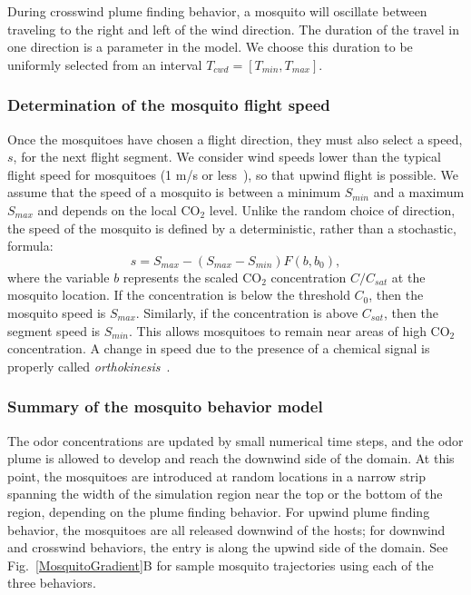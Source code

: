 \documentclass[10pt]{article}
\begin{document}
During crosswind plume finding behavior, a mosquito will oscillate
between traveling to the right and left of the wind direction.
The duration of the travel in one direction is a parameter in
the model. We choose this duration to be uniformly selected
from an interval $T_{cwd} = [T_{min},T_{max}]$.

\subsubsection*{Determination of the mosquito flight speed}
Once the mosquitoes have chosen a flight direction, they must also select a speed, $s$, for the next flight segment. 
We consider wind speeds lower than the typical flight speed for mosquitoes (1 m/s or less~\cite{Clements1999,Gibson1999}), so that upwind flight is possible. We assume that the speed of a mosquito is between a minimum $S_{min}$ and a maximum $S_{max}$ and depends on the local CO$_2$ level. Unlike the random choice of direction, the speed of the mosquito is defined by a deterministic, rather than a stochastic, formula:
\begin{equation}\label{eqn:speed}
	s = S_{max} - (S_{max} -  S_{min})F(b, b_0),
\end{equation}
where the variable $b$ represents the scaled CO$_2$ concentration $C/C_{sat}$ at the mosquito location.  If the concentration is below the threshold $C_0$, then the mosquito speed is $S_{max}$.  Similarly, if the concentration is above $C_{sat}$, then the segment speed is $S_{min}$.  This allows mosquitoes to remain near areas of high CO$_2$ concentration.  A change in speed due to the presence of a chemical signal is properly called \textit{orthokinesis}~\cite{Pierce-Shimomura1999}.

\subsubsection*{Summary of the mosquito behavior model}
The odor concentrations are updated by small numerical time steps, and the odor plume is allowed to develop and reach the downwind side of the domain. At this point, the mosquitoes are introduced at random locations in a narrow strip spanning the width of the simulation region near the top or the bottom of the region, depending on the plume finding behavior.  
For upwind plume finding behavior, the mosquitoes are all released downwind of the hosts;  for downwind and crosswind behaviors, the entry is along the upwind side of the domain. See Fig.~\ref{MosquitoGradient}B for sample mosquito trajectories using each of the three behaviors.
\end{document}
